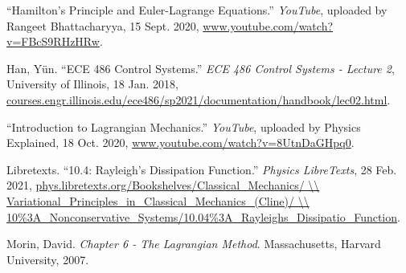 \begin{thebibliography}{99}

“Hamilton’s Principle and Euler-Lagrange Equations.” \emph{YouTube}, uploaded by Rangeet Bhattacharyya, 15 Sept. 2020, \url{www.youtube.com/watch?v=FBcS9RHzHRw}.

Han, Yün. “ECE 486 Control Systems.” \emph{ECE 486 Control Systems - Lecture 2}, University of Illinois, 18 Jan. 2018, \url{courses.engr.illinois.edu/ece486/sp2021/documentation/handbook/lec02.html}.

“Introduction to Lagrangian Mechanics.” \emph{YouTube}, uploaded by Physics Explained, 18 Oct. 2020, \url{www.youtube.com/watch?v=8UtnDaGHpq0}.



Libretexts. “10.4: Rayleigh’s Dissipation Function.” \emph{Physics LibreTexts}, 28 Feb. 2021, \url{phys.libretexts.org/Bookshelves/Classical\_Mechanics/ \\ Variational\_Principles\_in\_Classical\_Mechanics\_(Cline)/ \\ 10\%3A\_Nonconservative\_Systems/10.04\%3A\_Rayleighs\_Dissipatio\_Function}.




Morin, David. \emph{Chapter 6 - The Lagrangian Method}. Massachusetts, Harvard University, 2007.



\end{thebibliography}
